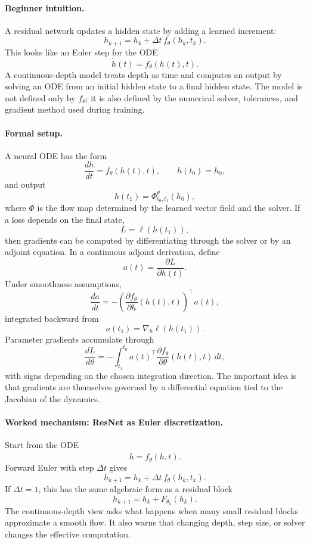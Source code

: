 \paragraph{Beginner intuition.}
A residual network updates a hidden state by adding a learned increment:
\[
h_{k+1}=h_k+\Delta t\, f_\theta(h_k,t_k).
\]
This looks like an Euler step for the ODE
\[
\dot h(t)=f_\theta(h(t),t).
\]
A continuous-depth model treats depth as time and computes an output by solving an ODE from an initial hidden state to a final hidden state. The model is not defined only by \(f_\theta\); it is also defined by the numerical solver, tolerances, and gradient method used during training.

\paragraph{Formal setup.}
A neural ODE has the form
\[
\frac{dh}{dt}=f_\theta(h(t),t),
\qquad h(t_0)=h_0,
\]
and output
\[
h(t_1)=\Phi_{t_0,t_1}^{\theta}(h_0),
\]
where \(\Phi\) is the flow map determined by the learned vector field and the solver. If a loss depends on the final state,
\[
L=\ell(h(t_1)),
\]
then gradients can be computed by differentiating through the solver or by an adjoint equation. In a continuous adjoint derivation, define
\[
a(t)=\frac{\partial L}{\partial h(t)}.
\]
Under smoothness assumptions,
\[
\frac{da}{dt}=-\left(\frac{\partial f_\theta}{\partial h}(h(t),t)\right)^\top a(t),
\]
integrated backward from
\[
a(t_1)=\nabla_h \ell(h(t_1)).
\]
Parameter gradients accumulate through
\[
\frac{dL}{d\theta}
=-\int_{t_1}^{t_0}
a(t)^\top \frac{\partial f_\theta}{\partial \theta}(h(t),t)\,dt,
\]
with signs depending on the chosen integration direction. The important idea is that gradients are themselves governed by a differential equation tied to the Jacobian of the dynamics.

\paragraph{Worked mechanism: ResNet as Euler discretization.}
Start from the ODE
\[
\dot h=f_\theta(h,t).
\]
Forward Euler with step \(\Delta t\) gives
\[
h_{k+1}=h_k+\Delta t\,f_\theta(h_k,t_k).
\]
If \(\Delta t=1\), this has the same algebraic form as a residual block
\[
h_{k+1}=h_k+F_{\theta_k}(h_k).
\]
The continuous-depth view asks what happens when many small residual blocks approximate a smooth flow. It also warns that changing depth, step size, or solver changes the effective computation.

